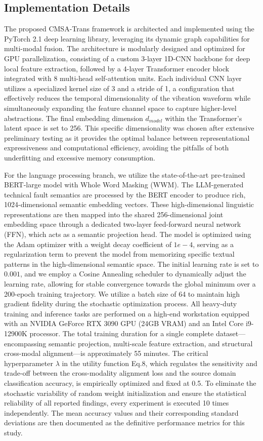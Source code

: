 \documentclass[journal]{IEEEtran}
\begin{document}
\subsection{Implementation Details}
The proposed CMSA-Trans framework is architected and implemented using the PyTorch 2.1 deep learning library, leveraging its dynamic graph capabilities for multi-modal fusion. The architecture is modularly designed and optimized for GPU parallelization, consisting of a custom 3-layer 1D-CNN backbone for deep local feature extraction, followed by a 4-layer Transformer encoder block integrated with 8 multi-head self-attention units. Each individual CNN layer utilizes a specialized kernel size of 3 and a stride of 1, a configuration that effectively reduces the temporal dimensionality of the vibration waveform while simultaneously expanding the feature channel space to capture higher-level abstractions. The final embedding dimension $d_{model}$ within the Transformer's latent space is set to 256. This specific dimensionality was chosen after extensive preliminary testing as it provides the optimal balance between representational expressiveness and computational efficiency, avoiding the pitfalls of both underfitting and excessive memory consumption. 

For the language processing branch, we utilize the state-of-the-art pre-trained BERT-large model with Whole Word Masking (WWM). The LLM-generated technical fault semantics are processed by the BERT encoder to produce rich, 1024-dimensional semantic embedding vectors. These high-dimensional linguistic representations are then mapped into the shared 256-dimensional joint embedding space through a dedicated two-layer feed-forward neural network (FFN), which acts as a semantic projection head. The model is optimized using the Adam optimizer with a weight decay coefficient of $1e-4$, serving as a regularization term to prevent the model from memorizing specific textual patterns in the high-dimensional semantic space. The initial learning rate is set to $0.001$, and we employ a Cosine Annealing scheduler to dynamically adjust the learning rate, allowing for stable convergence towards the global minimum over a 200-epoch training trajectory. We utilize a batch size of 64 to maintain high gradient fidelity during the stochastic optimization process. All heavy-duty training and inference tasks are performed on a high-end workstation equipped with an NVIDIA GeForce RTX 3090 GPU (24GB VRAM) and an Intel Core i9-12900K processor. The total training duration for a single complete dataset—encompassing semantic projection, multi-scale feature extraction, and structural cross-modal alignment—is approximately 55 minutes. The critical hyperparameter $\lambda$ in the utility function Eq.8, which regulates the sensitivity and trade-off between the cross-modality alignment loss and the source domain classification accuracy, is empirically optimized and fixed at 0.5. To eliminate the stochastic variability of random weight initialization and ensure the statistical reliability of all reported findings, every experiment is executed 10 times independently. The mean accuracy values and their corresponding standard deviations are then documented as the definitive performance metrics for this study.
\end{document}
